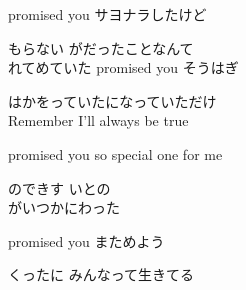 {promised you サヨナラしたけど

もらない がだったことなんて
\\

れてめていた promised you そうはぎ

はかをっていたになっていただけ
\\

Remember I'll always be true

promised you so special one for me

のできす いとの
\\

がいつかにわった

promised you まためよう

くったに みんなって生きてる

}